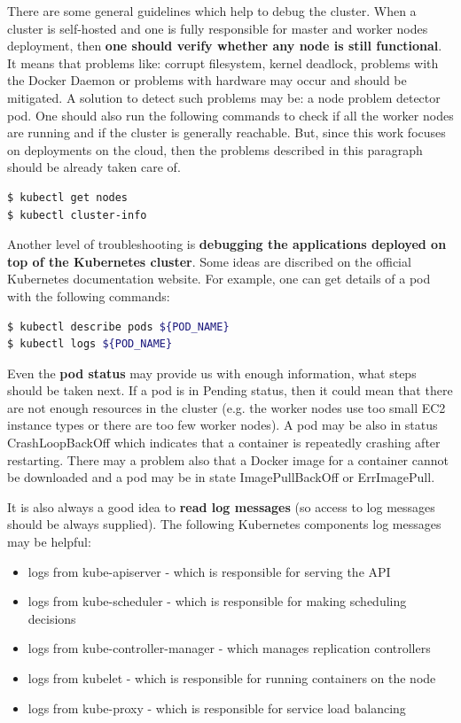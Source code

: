 There are some general guidelines which help to debug the cluster. When a cluster is self-hosted and one is fully responsible for master and worker nodes deployment, then \textbf{one should verify whether any node is still functional}. It means that problems like: corrupt filesystem, kernel deadlock, problems with the Docker Daemon or problems with hardware may occur and should be mitigated. A solution to detect such problems may be: a node problem detector pod\cite{book-mastering-k8s}. One should also run the following commands to check if all the worker nodes are running and if the cluster is generally reachable. But, since this work focuses on deployments on the cloud, then the problems described in this paragraph should be already taken care of.
\begin{lstlisting}[basicstyle=\tiny,caption={TODO},captionpos=b,language=Bash,xleftmargin=1cm]
$ kubectl get nodes
$ kubectl cluster-info
\end{lstlisting}

Another level of troubleshooting is \textbf{debugging the applications deployed on top of the Kubernetes cluster}. Some ideas are discribed on the official Kubernetes documentation website\cite{k8s-deb}. For example, one can get details of a pod with the following commands:
\begin{lstlisting}[basicstyle=\tiny,caption={TODO},captionpos=b,language=Bash,xleftmargin=1cm]
$ kubectl describe pods ${POD_NAME}
$ kubectl logs ${POD_NAME}
\end{lstlisting}

Even the \textbf{pod status} may provide us with enough information, what steps should be taken next. If a pod is in Pending status, then it could mean that there are not enough resources in the cluster (e.g. the worker nodes use too small EC2 instance types or there are too few worker nodes). A pod may be also in status CrashLoopBackOff which indicates that a container is repeatedly crashing after restarting. There may a problem also that a Docker image for a container cannot be downloaded and a pod may be in state ImagePullBackOff or ErrImagePull\cite{k8s-google-tr}.

It is also always a good idea to \textbf{read log messages} (so access to log messages should be always supplied). The following Kubernetes components log messages may be helpful\cite{k8s-deb-cluster}:
\begin{itemize}
\item logs from kube-apiserver - which is responsible for serving the API
\item logs from kube-scheduler - which is responsible for making scheduling decisions
\item logs from kube-controller-manager - which manages replication controllers
\item logs from kubelet - which is responsible for running containers on the node
\item logs from kube-proxy - which is responsible for service load balancing
\end{itemize}

